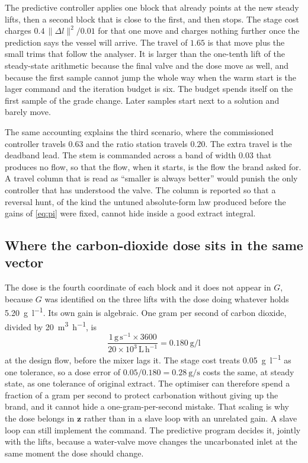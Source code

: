 The predictive controller applies one block that already points at the new steady lifts, then a second block that is close to the first, and then stops. The stage cost charges $0.4\,\|\Delta l\|^{2}/0.01$ for that one move and charges nothing further once the prediction says the vessel will arrive. The travel of $1.65$ is that move plus the small trims that follow the analyser. It is larger than the one-tenth lift of the steady-state arithmetic because the final valve and the dose move as well, and because the first sample cannot jump the whole way when the warm start is the lager command and the iteration budget is six. The budget spends itself on the first sample of the grade change. Later samples start next to a solution and barely move.

The same accounting explains the third scenario, where the commissioned controller travels $0.63$ and the ratio station travels $0.20$. The extra travel is the deadband lead. The stem is commanded across a band of width $0.03$ that produces no flow, so that the flow, when it starts, is the flow the brand asked for. A travel column that is read as ``smaller is always better'' would punish the only controller that has understood the valve. The column is reported so that a reversal hunt, of the kind the untuned absolute-form law produced before the gains of \eqref{eq:pi} were fixed, cannot hide inside a good extract integral.

\subsection{Where the carbon-dioxide dose sits in the same vector}
\label{sec:dosegain}

The dose is the fourth coordinate of each block and it does not appear in $G$, because $G$ was identified on the three lifts with the dose doing whatever holds \SI{5.20}{\gram\per\litre}. Its own gain is algebraic. One gram per second of carbon dioxide, divided by \SI{20}{\cubic\metre\per\hour}, is
\begin{equation}
\frac{1\,\mathrm{g\,s^{-1}}\times 3600}{20\times 10^{3}\,\mathrm{L\,h^{-1}}}
=
\SI{0.180}{\gram\per\litre}
\end{equation}
at the design flow, before the mixer lags it. The stage cost treats \SI{0.05}{\gram\per\litre} as one tolerance, so a dose error of $0.05/0.180=\SI{0.28}{\gram\per\second}$ costs the same, at steady state, as one tolerance of original extract. The optimiser can therefore spend a fraction of a gram per second to protect carbonation without giving up the brand, and it cannot hide a one-gram-per-second mistake. That scaling is why the dose belongs in $\mathbf{z}$ rather than in a slave loop with an unrelated gain. A slave loop can still implement the command. The predictive program decides it, jointly with the lifts, because a water-valve move changes the uncarbonated inlet at the same moment the dose should change.

